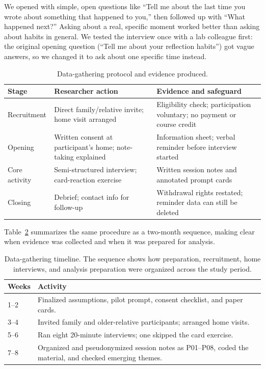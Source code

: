 \documentclass[sigconf,nonacm]{acmart}
\begin{document}
We opened with simple, open questions like ``Tell me about the last time you
wrote about something that happened to you,'' then followed up with ``What
happened next?'' Asking about a real, specific moment worked better than
asking about habits in general. We tested the interview once with a lab
colleague first: the original opening question (``Tell me about your
reflection habits'') got vague answers, so we changed it to ask about one
specific time instead.

\begin{table}[tb]
  \caption{Data-gathering protocol and evidence produced.}
  \label{tab:protocol}
  \begin{tabularx}{\textwidth}{@{}l X X@{}}
    \toprule
    Stage & Researcher action & Evidence and safeguard \\
    \midrule
    Recruitment & Direct family/relative invite; home visit arranged & Eligibility check; participation voluntary; no payment or course credit \\
    Opening & Written consent at participant's home; note-taking explained & Information sheet; verbal reminder before interview started \\
    Core activity & Semi-structured interview; card-reaction exercise & Written session notes and annotated prompt cards \\
    Closing & Debrief; contact info for follow-up & Withdrawal rights restated; reminder data can still be deleted \\
    \bottomrule
  \end{tabularx}
\end{table}

Table~\ref{tab:gatheringtimeline} summarizes the same procedure as a
two-month sequence, making clear when evidence was collected and when it was
prepared for analysis.

\begin{table}[tb]
  \centering
  \small
  \caption{Data-gathering timeline. The sequence shows how preparation,
  recruitment, home interviews, and analysis preparation were
  organized across the study period.}
  \label{tab:gatheringtimeline}
  \begin{tabularx}{\columnwidth}{@{}l X@{}}
    \toprule
    Weeks & Activity \\
    \midrule
    1--2 & Finalized assumptions, pilot prompt, consent checklist, and paper cards. \\
    3--4 & Invited family and older-relative participants; arranged home visits. \\
    5--6 & Ran eight 20-minute interviews; one skipped the card exercise. \\
    7--8 & Organized and pseudonymized session notes as P01--P08, coded the material, and checked emerging themes. \\
    \bottomrule
  \end{tabularx}
\end{table}
\end{document}
